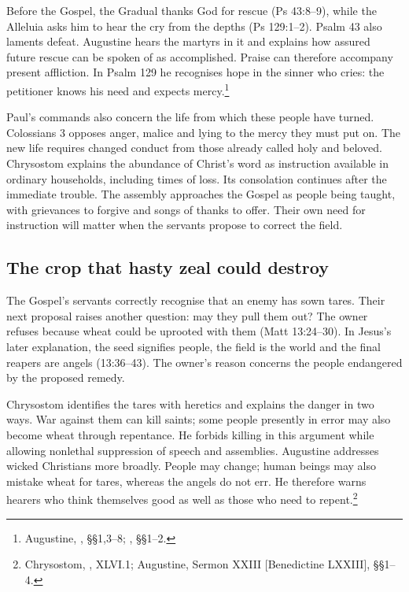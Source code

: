 Before the Gospel, the Gradual thanks God for rescue (Ps 43:8--9), while
the Alleluia asks him to hear the cry from the depths (Ps 129:1--2).
Psalm 43 also laments defeat. Augustine hears the martyrs in it and
explains how assured future rescue can be spoken of as accomplished.
Praise can therefore accompany present affliction. In Psalm 129 he
recognises hope in the sinner who cries: the petitioner knows his need
and expects mercy.\footnote{Augustine, ,
§§1,3--8; , §§1--2.}

Paul's commands also concern the life from which these people have turned.
Colossians 3 opposes anger, malice and lying to the mercy they must put on.
The new life requires changed conduct from those already called holy and
beloved. Chrysostom explains the abundance of Christ's word as instruction
available in ordinary households, including times of loss. Its consolation
continues after the immediate trouble. The assembly approaches the Gospel
as people being taught, with grievances to forgive and songs of thanks
to offer. Their own need for instruction will matter when the servants
propose to correct the field.

\clearpage
\subsection{The crop that hasty zeal could destroy}
The Gospel's servants correctly recognise that an enemy has sown tares.
Their next proposal raises another question: may they pull them out?
The owner refuses because wheat could be uprooted with them
(Matt 13:24--30). In Jesus's later explanation, the seed signifies people,
the field is the world and the final reapers are angels (13:36--43).
The owner's reason concerns the people endangered by the proposed remedy.

Chrysostom identifies the tares with heretics and explains the danger in
two ways. War against them can kill saints; some people presently in error
may also become wheat through repentance. He forbids killing in this
argument while allowing nonlethal suppression of speech and assemblies.
Augustine addresses wicked Christians more broadly. People may change;
human beings may also mistake wheat for tares, whereas the angels do not
err. He therefore warns hearers who think themselves good as well as
those who need to repent.\footnote{Chrysostom, ,
XLVI.1; Augustine, Sermon XXIII [Benedictine LXXIII], §§1--4.}

